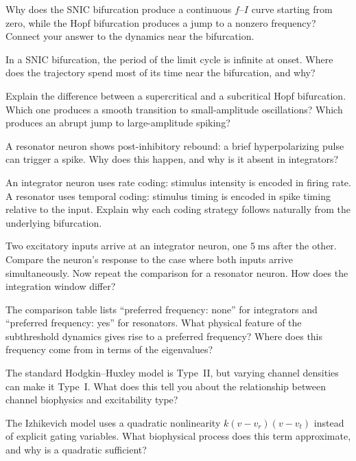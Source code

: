 \begin{conceptquestions}
  \item Why does the SNIC bifurcation produce a continuous $f$--$I$ curve starting from zero, while the Hopf bifurcation produces a jump to a nonzero frequency? Connect your answer to the dynamics near the bifurcation.

  \item In a SNIC bifurcation, the period of the limit cycle is infinite at onset. Where does the trajectory spend most of its time near the bifurcation, and why?

  \item Explain the difference between a supercritical and a subcritical Hopf bifurcation. Which one produces a smooth transition to small-amplitude oscillations? Which produces an abrupt jump to large-amplitude spiking?

  \item A resonator neuron shows post-inhibitory rebound: a brief hyperpolarizing pulse can trigger a spike. Why does this happen, and why is it absent in integrators?

  \item An integrator neuron uses rate coding: stimulus intensity is encoded in firing rate. A resonator uses temporal coding: stimulus timing is encoded in spike timing relative to the input. Explain why each coding strategy follows naturally from the underlying bifurcation.

  \item Two excitatory inputs arrive at an integrator neuron, one $5\;\text{ms}$ after the other. Compare the neuron's response to the case where both inputs arrive simultaneously. Now repeat the comparison for a resonator neuron. How does the integration window differ?

  \item The comparison table lists ``preferred frequency: none'' for integrators and ``preferred frequency: yes'' for resonators. What physical feature of the subthreshold dynamics gives rise to a preferred frequency? Where does this frequency come from in terms of the eigenvalues?

  \item The standard Hodgkin--Huxley model is Type~II, but varying channel densities can make it Type~I. What does this tell you about the relationship between channel biophysics and excitability type?

  \item The Izhikevich model uses a quadratic nonlinearity $k(v - v_r)(v - v_t)$ instead of explicit gating variables. What biophysical process does this term approximate, and why is a quadratic sufficient?


\end{conceptquestions}
